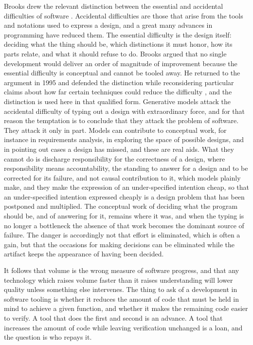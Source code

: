\documentclass[11pt,a4paper]{article}
\theoremstyle{remark}
\begin{document}
Brooks drew the relevant distinction between the essential and accidental difficulties of software \cite{Brooks1987}. Accidental difficulties are those that arise from the tools and notations used to express a design, and a great many advances in programming have reduced them. The essential difficulty is the design itself: deciding what the thing should be, which distinctions it must honor, how its parts relate, and what it should refuse to do. Brooks argued that no single development would deliver an order of magnitude of improvement because the essential difficulty is conceptual and cannot be tooled away. He returned to the argument in 1995 and defended the distinction while reconsidering particular claims about how far certain techniques could reduce the difficulty \cite{Brooks1995}, and the distinction is used here in that qualified form. Generative models attack the accidental difficulty of typing out a design with extraordinary force, and for that reason the temptation is to conclude that they attack the problem of software. They attack it only in part. Models can contribute to conceptual work, for instance in requirements analysis, in exploring the space of possible designs, and in pointing out cases a design has missed, and these are real aids. What they cannot do is discharge responsibility for the correctness of a design, where responsibility means accountability, the standing to answer for a design and to be corrected for its failure, and not causal contribution to it, which models plainly make, and they make the expression of an under-specified intention cheap, so that an under-specified intention expressed cheaply is a design problem that has been postponed and multiplied. The conceptual work of deciding what the program should be, and of answering for it, remains where it was, and when the typing is no longer a bottleneck the absence of that work becomes the dominant source of failure. The danger is accordingly not that effort is eliminated, which is often a gain, but that the occasions for making decisions can be eliminated while the artifact keeps the appearance of having been decided.

It follows that volume is the wrong measure of software progress, and that any technology which raises volume faster than it raises understanding will lower quality unless something else intervenes. The thing to ask of a development in software tooling is whether it reduces the amount of code that must be held in mind to achieve a given function, and whether it makes the remaining code easier to verify. A tool that does the first and second is an advance. A tool that increases the amount of code while leaving verification unchanged is a loan, and the question is who repays it.
\end{document}
